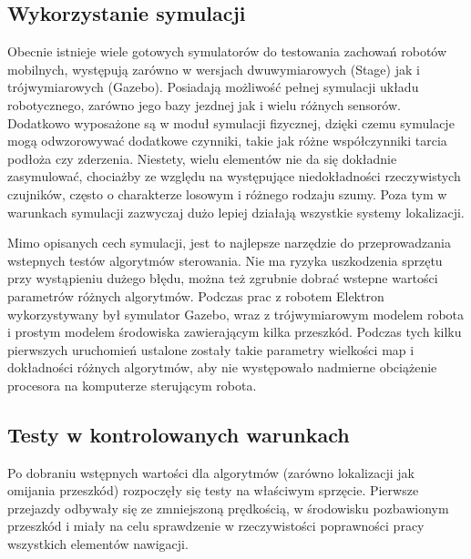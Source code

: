 \subsection{Wykorzystanie symulacji}

Obecnie istnieje wiele gotowych symulatorów do testowania zachowań robotów
mobilnych, występują zarówno w wersjach dwuwymiarowych (Stage) jak i trójwymiarowych
(Gazebo). Posiadają możliwość pełnej symulacji układu robotycznego, zarówno
jego bazy jezdnej jak i wielu różnych sensorów. Dodatkowo wyposażone są 
w moduł symulacji fizycznej, dzięki czemu symulacje mogą odwzorowywać dodatkowe
czynniki, takie jak różne współczynniki tarcia podłoża czy zderzenia. 
Niestety, wielu elementów nie da się dokładnie zasymulować, chociażby ze
względu na występujące niedokładności rzeczywistych czujników, często o charakterze
losowym i różnego rodzaju szumy. Poza tym w warunkach symulacji zazwyczaj dużo
lepiej działają wszystkie systemy lokalizacji. 

Mimo opisanych cech symulacji, jest to najlepsze narzędzie do przeprowadzania
wstepnych testów algorytmów sterowania. Nie ma ryzyka uszkodzenia sprzętu
przy wystąpieniu dużego błędu, można też zgrubnie dobrać wstepne wartości
parametrów różnych algorytmów. Podczas prac z robotem Elektron wykorzystywany
był symulator Gazebo, wraz z trójwymiarowym modelem robota i prostym modelem
środowiska zawierającym kilka przeszkód. Podczas tych kilku pierwszych uruchomień
ustalone zostały takie parametry wielkości map i dokładności różnych algorytmów,
aby nie występowało nadmierne obciążenie procesora na komputerze sterującym
robota.

\subsection{Testy w kontrolowanych warunkach}

Po dobraniu wstępnych wartości dla algorytmów (zarówno lokalizacji jak 
omijania przeszkód) rozpoczęły się testy na właściwym sprzęcie. Pierwsze 
przejazdy odbywały się ze zmniejszoną prędkością, w środowisku pozbawionym
przeszkód i miały na celu sprawdzenie w rzeczywistości poprawności pracy
wszystkich elementów nawigacji.

